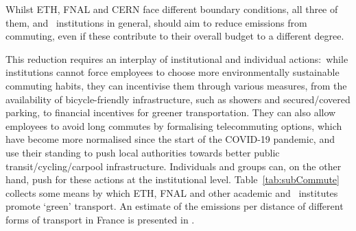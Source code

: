 \documentclass[../SustainableHEP.tex]{subfiles}
\begin{document}
Whilst ETH, FNAL and CERN face different boundary conditions, all three of them, and \ACR\ institutions in general, should aim to reduce emissions from commuting, even if these contribute to their overall budget to a different degree.

This reduction requires an interplay of institutional and individual actions:\ while institutions cannot force employees to choose more environmentally sustainable commuting habits, they can incentivise them through various measures, from the availability of bicycle-friendly infrastructure, such as showers and secured/covered parking, to financial incentives for greener transportation. They can also allow employees to avoid long commutes by formalising telecommuting options, which have become more normalised since the start of the COVID-19 pandemic, and use their standing to push local authorities towards better public transit/cycling/carpool infrastructure. Individuals and groups can, on the other hand, push for these actions at the institutional level. Table~\ref{tab:subCommute} collects some means by which ETH, FNAL and other academic and \ACR\ institutes promote `green' transport. An estimate of the emissions per distance
of different forms of transport in France is presented in .

\end{document}
